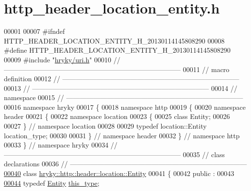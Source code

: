 \hypertarget{http__header__location__entity_8h_source}{\section{http\-\_\-header\-\_\-location\-\_\-entity.\-h}
}

\begin{DoxyCode}
00001 
00007 \textcolor{preprocessor}{#ifndef HTTP\_HEADER\_LOCATION\_ENTITY\_H\_20130114145808290}
00008 \textcolor{preprocessor}{}\textcolor{preprocessor}{#define HTTP\_HEADER\_LOCATION\_ENTITY\_H\_20130114145808290}
00009 \textcolor{preprocessor}{}\textcolor{preprocessor}{#include "\hyperlink{uri_8h}{hryky/uri.h}"}
00010 \textcolor{comment}{//
      ------------------------------------------------------------------------------}
00011 \textcolor{comment}{// macro definition}
00012 \textcolor{comment}{//
      ------------------------------------------------------------------------------}
00013 \textcolor{comment}{//
      ------------------------------------------------------------------------------}
00014 \textcolor{comment}{// namespace}
00015 \textcolor{comment}{//
      ------------------------------------------------------------------------------}
00016 \textcolor{keyword}{namespace }hryky
00017 \{
00018 \textcolor{keyword}{namespace }http
00019 \{
00020 \textcolor{keyword}{namespace }header
00021 \{
00022 \textcolor{keyword}{namespace }location
00023 \{
00025     \textcolor{keyword}{class }Entity;
00026 
00027 \} \textcolor{comment}{// namespace location}
00028 
00029 \textcolor{keyword}{typedef} location::Entity location\_type;
00030 
00031 \} \textcolor{comment}{// namespace header}
00032 \} \textcolor{comment}{// namespace http}
00033 \} \textcolor{comment}{// namespace hryky}
00034 \textcolor{comment}{//
      ------------------------------------------------------------------------------}
00035 \textcolor{comment}{// class declarations}
00036 \textcolor{comment}{//
      ------------------------------------------------------------------------------}
\hypertarget{http__header__location__entity_8h_source_l00040}{}\hyperlink{classhryky_1_1http_1_1header_1_1location_1_1_entity}{00040} \textcolor{comment}{}\textcolor{keyword}{class }\hyperlink{classhryky_1_1http_1_1header_1_1location_1_1_entity}{hryky::http::header::location::Entity}
00041 \{
00042 \textcolor{keyword}{public} :
00043 
\hypertarget{http__header__location__entity_8h_source_l00044}{}\hyperlink{classhryky_1_1http_1_1header_1_1location_1_1_entity_a49f0f7642755afebfca2a040ba041853}{00044}     \textcolor{keyword}{typedef} \hyperlink{classhryky_1_1http_1_1header_1_1location_1_1_entity}{Entity} \hyperlink{classhryky_1_1http_1_1header_1_1location_1_1_entity_a49f0f7642755afebfca2a040ba041853}{this_type};

\end{DoxyCode}
